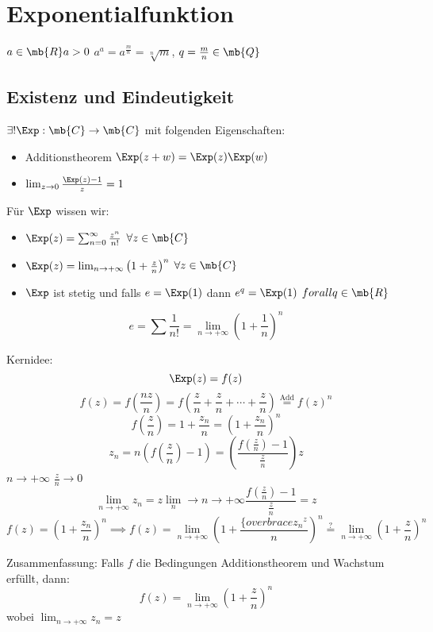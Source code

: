 \section{Exponentialfunktion}
$a\in\mb{R} a>0$ $a^a=a^\frac{m}{n}=\sqrt[n]{m}$, $q=\frac{m}{n}\in\mb{Q}$
\subsection{Existenz und Eindeutigkeit}
\begin{Sat}
  $\exists ! \Exp:\mb{C}\to\mb{C}$ mit folgenden Eigenschaften:
  \begin{itemize}
    \item Additionstheorem $\Exp(z+w)=\Exp(z)\Exp(w)$
    \item $\lim_{z\to 0}\frac{\Exp(z)-1}{z}=1$
  \end{itemize}
  Für $\Exp$ wissen wir:
  \begin{itemize}
    \item $\Exp(z)=\sum_{n=0}^\infty\frac{z^n}{n!}$ $\forall z\in\mb{C}$
    \item $\Exp(z)=\lim_{n\to+\infty}\left( 1+\frac{z}{n} \right)^n$ $\forall z\in \mb{C}$
    \item $\Exp$ ist stetig und falls $e=\Exp(1)$ dann $e^q=\Exp(1)$ $forall q\in \mb{R}$
  \end{itemize}
\end{Sat}
\begin{Bem}
  \[e=\sum\frac{1}{n!}=\lim_{n\to+\infty}\left( 1+\frac{1}{n} \right)^n\]
\end{Bem}
\begin{Bem}
  Kernidee:
  \[\Exp(z)=f(z)\]
  \[f(z) = f(\frac{nz}{n})=f(\frac{z}{n}+\frac{z}{n}+\cdots+\frac{z}{n})\stackrel{\text{Add}}{=}f(z)^n\]
  \[f\left( \frac{z}{n} \right)=1+\frac{z_n}{n}=\left( 1+\frac{z_n}{n} \right)^n\]
  \[z_n=n\left( f\left( \frac{z}{n} \right) -1 \right)=\left( \frac{f\left( \frac{z}{n} \right)-1}{\frac{z}{n}} \right)z\]
  $n\to+\infty$ $\frac{z}{n}\to 0$
  \[\lim_{n\to+\infty}z_n=z\lim_n\to{n\to+\infty}\frac{f\left( \frac{z}{n} \right)-1}{\frac{z}{n}}=z\]
  \[f(z)=\left( 1+\frac{z_n}{n}\right)^n\implies f(z)=\lim_{n\to+\infty}\left( 1+\frac{\{overbrace{z_n}^z}{n}\right)^n\stackrel{?}{=}\lim_{n\to+\infty}\left( 1+\frac{z}{n}\right)^n\]
\end{Bem}
\begin{Bem}
  Zusammenfassung: Falls $f$ die Bedingungen Additionstheorem und Wachstum erfüllt, dann:
  \[f(z)=\lim_{n\to +\infty}\left( 1+\frac{z}{n}\right)^n\]
  wobei $\lim_{n\to +\infty}z_n=z$
\end{Bem}
